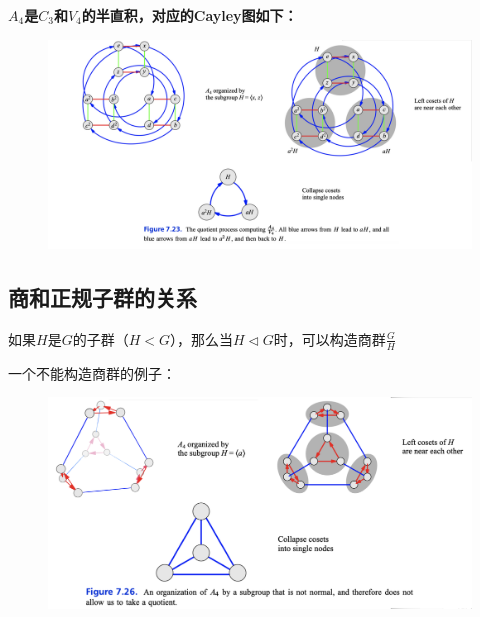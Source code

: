 \documentclass[12pt]{article}
\begin{document}
\textbf{$A_4$是$C_3$和$V_4$的半直积，对应的Cayley图如下：}
\begin{figure}[H]
    \centering
    \includegraphics[width=1\textwidth]{fig/Group/Cayley-A4-quotient-V4.png}
\end{figure}

\subsection{商和正规子群的关系}
\begin{mdframed}[
linecolor=black!40,outerlinewidth=1pt,roundcorner=.5em,innertopmargin=1ex,innerbottommargin=.5\baselineskip,innerrightmargin=1em,innerleftmargin=1em,backgroundcolor=gray!5,
]
如果$H$是$G$的子群（$H < G$），那么当$H \lhd G$时，可以构造商群$\frac{G}{H}$
\end{mdframed}

一个不能构造商群的例子：
\begin{figure}[H]
    \centering
    \includegraphics[width=1\textwidth]{fig/Group/Cayley-A4-cannot-quotient-C3.png}
\end{figure}
\end{document}
